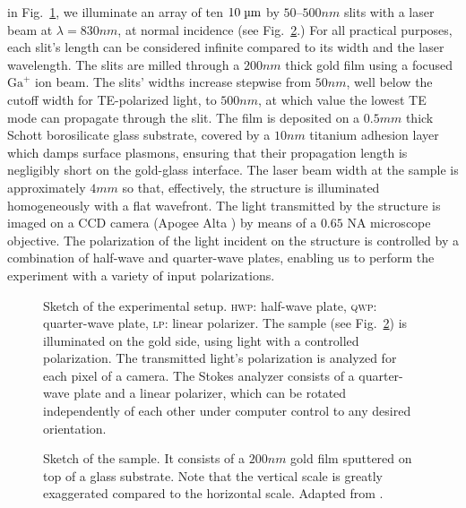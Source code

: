  in Fig.~\ref{Fig:setup}, we illuminate an array of ten $10\micron$ by $50$--$500\unit{nm}$ slits with a laser beam at $\lambda=830\unit{nm}$, at normal incidence (see Fig.~\ref{qwp:fig:sample}.)
For all practical purposes, each slit's length can be considered infinite compared to its width and the laser wavelength.
The slits are milled through a $200\unit{nm}$ thick gold film using a focused $\text{Ga}^+$ ion beam.
The slits' widths increase stepwise from $50\unit{nm}$, well below the cutoff width for \gls{TE}-polarized light, to $500\unit{nm}$, at which value the lowest \gls{TE} mode can propagate through the slit.
The film is deposited on a $0.5\unit{mm}$ thick Schott  borosilicate glass substrate, covered by a $10\unit{nm}$ titanium adhesion layer which damps surface plasmons, ensuring that their propagation length is negligibly short on the gold-glass interface.
The laser beam width at the sample is approximately $4\unit{mm}$ so that, effectively, the structure is illuminated homogeneously with a flat wavefront.
The light transmitted by the structure is imaged on a \gls{CCD} camera (Apogee Alta ) by means of a $0.65$ \gls{NA} microscope objective.
The polarization of the light incident on the structure is controlled by a combination of half-wave and quarter-wave plates, enabling us to perform the experiment with a variety of input polarizations.
%
%
\begin{figure}[tb]
\centering{}
\caption{Sketch of the experimental setup.
\textsc{hwp}: half-wave plate, \textsc{qwp}: quarter-wave plate, \textsc{lp}: linear polarizer.
The sample (see Fig.~\ref{qwp:fig:sample}) is illuminated on the gold side, using light with a controlled polarization.
The transmitted light's polarization is analyzed for each pixel of a  camera.
The Stokes analyzer consists of a quarter-wave plate and a linear polarizer, which can be rotated independently of each other under computer control to any desired orientation.}
\label{Fig:setup}
\end{figure}
%
\begin{figure}[b]
\caption{Sketch of the sample.
It consists of a $200\unit{nm}$ gold film sputtered on top of a glass substrate.
Note that the vertical scale is greatly exaggerated compared to the horizontal scale.
Adapted from \textcite[p.~78]{KuzminPhDThesis}.}
\label{qwp:fig:sample}
\end{figure}
%


